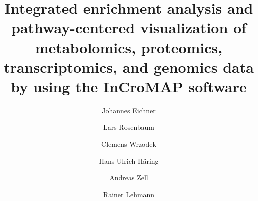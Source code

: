 \documentclass[final,5p,times,twocolumn]{elsarticle}
\begin{document}
\begin{frontmatter}



\title{Integrated enrichment analysis and pathway-centered visualization of metabolomics, proteomics, transcriptomics, and genomics data by using the InCroMAP software}


\author[uni]{Johannes Eichner}
\author[uni]{Lars Rosenbaum}
\author[uni]{Clemens Wrzodek}
\author[idm,endo,dzd]{Hans-Ulrich H\"aring}
\author[uni]{Andreas Zell}
\author[idm,zentrallabor,dzd]{Rainer Lehmann}
\address[uni]{Center for Bioinformatics, University of T\"ubingen, T\"ubingen, Germany}
\address[idm]{Institute for Diabetes Research and Metabolic Diseases of the Helmholtz Centre Munich at the University of T\"ubingen, T\"ubingen, Germany}
\address[endo]{Division of Endocrinology, Diabetology, Vascular Medicine, Nephrology and Clinical Chemistry, Department of Internal Medicine IV, University Hospital T\"ubingen, T\"ubingen, Germany}
\address[zentrallabor]{Division of Clinical Chemistry and Pathobiochemistry, Department of Internal Medicine IV, University Hospital T\"ubingen, T\"ubingen, Germany}
\address[dzd]{German Center for Diabetes Research (DZD), Germany}



\end{frontmatter}
\end{document}
